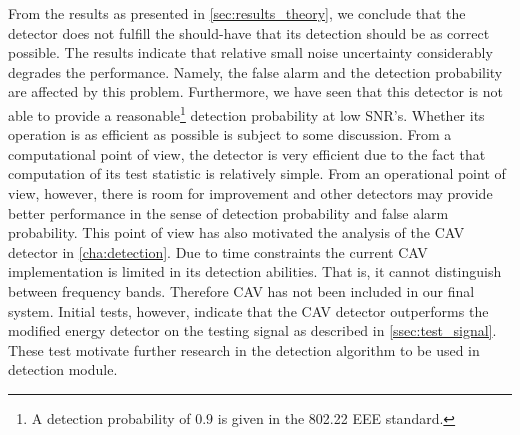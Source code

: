 \documentclass[a4paper, openany, oneside]{memoir}
\begin{document}
From the results as presented in \cref{sec:results_theory}, we conclude that the detector does not fulfill the should-have that its detection should be as correct possible. The results indicate that relative small noise uncertainty considerably degrades the  performance. Namely, the false alarm and the detection probability are affected by this problem. Furthermore, we have seen that this detector is not able to provide a reasonable\footnote{A detection probability of $0.9$ is given in the 802.22 EEE standard.} detection probability at low SNR's. Whether its operation is as efficient as possible is subject  to some discussion. From a computational point of view, the detector is very efficient due to the fact that computation of its test statistic is relatively simple. From an operational point of view, however, there is room for improvement and other detectors may provide better performance in the sense of detection probability and false alarm probability. This point of view has also motivated the analysis of the CAV detector in \cref{cha:detection}. Due to time constraints the current CAV implementation is limited in its detection abilities. That is, it cannot distinguish between frequency bands. Therefore CAV has not been included in our final system. Initial tests, however, indicate that the CAV detector outperforms the modified energy detector on the testing signal as described in \cref{ssec:test_signal}. These test motivate further research in the detection algorithm to be used in detection module. 
\end{document}
